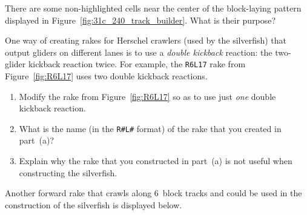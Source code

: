 \vspace*{-0.4cm}\hrulefill\vspace*{-0.3cm}\footnotesize\begin{multicols}{2}\vspace*{-0.4cm}\raggedcolumns{}
	\setlength{\parskip}{0pt}
	
	
	\begin{problem}\label{exer:self_support_spaceships_track_layer_rephaser}
		There are some non-highlighted cells near the center of the block-laying pattern displayed in Figure~\ref{fig:31c_240_track_builder}. What is their purpose?
	\end{problem}
	
	
	\mfilbreak
	
	
	\begin{problemstar}\label{exer:self_support_spaceships_r4l1}
		One way of creating rakes for Herschel crawlers (used by the silverfish) that output gliders on different lanes is to use a \emph{double kickback} reaction: the two-glider kickback reaction twice. For example, the \texttt{R6L17} rake from Figure~\ref{fig:R6L17} uses two double kickback reactions.
		
		\begin{enumerate}[label=\bf\color{ocre}(\alph*)]
			\item Modify the rake from Figure~\ref{fig:R6L17} so as to use just \emph{one} double kickback reaction.
			
			\item What is the name (in the \texttt{R\#L\#} format) of the rake that you created in part~(a)?
			
			\item Explain why the rake that you constructed in part~(a) is not useful when constructing the silverfish.
		\end{enumerate}
	\end{problemstar}
	
	
	\mfilbreak
	
	
	\begin{problem}\label{exer:self_support_spaceships_r6l21}
		Another forward rake that crawls along $6$~block tracks and could be used in the construction of the silverfish is displayed below.
		\begin{center}
		\end{center}
		

\end{problem}
\end{multicols}
